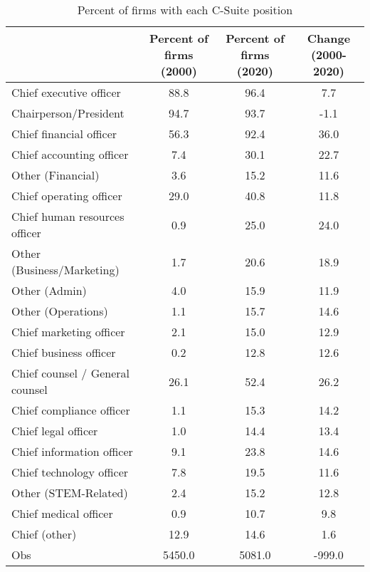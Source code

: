 \begin{table}[htbp]\centering
\caption{Percent of firms with each C-Suite position\label{tab98}}
\begin{tabular}{l*{3}{c}}
\toprule
                    &Percent of firms (2000)&Percent of firms (2020)&Change (2000-2020)\\
\midrule
Chief executive officer&        88.8&        96.4&         7.7\\
Chairperson/President&        94.7&        93.7&        -1.1\\
Chief financial officer&        56.3&        92.4&        36.0\\
Chief accounting officer&         7.4&        30.1&        22.7\\
Other (Financial)   &         3.6&        15.2&        11.6\\
Chief operating officer&        29.0&        40.8&        11.8\\
Chief human resources officer&         0.9&        25.0&        24.0\\
Other (Business/Marketing)&         1.7&        20.6&        18.9\\
Other (Admin)       &         4.0&        15.9&        11.9\\
Other (Operations)  &         1.1&        15.7&        14.6\\
Chief marketing officer&         2.1&        15.0&        12.9\\
Chief business officer&         0.2&        12.8&        12.6\\
Chief counsel / General counsel&        26.1&        52.4&        26.2\\
Chief compliance officer&         1.1&        15.3&        14.2\\
Chief legal officer &         1.0&        14.4&        13.4\\
Chief information officer&         9.1&        23.8&        14.6\\
Chief technology officer&         7.8&        19.5&        11.6\\
Other (STEM-Related)&         2.4&        15.2&        12.8\\
Chief medical officer&         0.9&        10.7&         9.8\\
Chief (other)       &        12.9&        14.6&         1.6\\
Obs                 &      5450.0&      5081.0&      -999.0\\
\bottomrule

\end{tabular}
\end{table}
